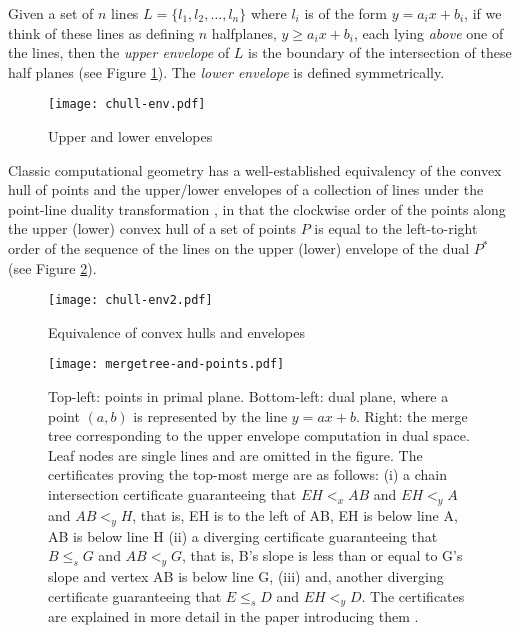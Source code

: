 \documentclass[11pt]{article}
\begin{document}
Given a set of $n$ lines $L= \{l_1, l_2, \ldots, l_n\}$ where $l_i$ is of the form
$y=a_ix+b_i$, if we think of these
lines as defining $n$ halfplanes, $y \ge a_ix+b_i$, each lying \emph{above}
one of the lines, then the \emph{upper envelope} of $L$ is the boundary of the intersection of these half planes (see Figure \ref{fig:envelope}). The \emph{lower envelope} is defined symmetrically.
\begin{figure}[H]
\begin{center}
\texttt{[image: chull-env.pdf]}
\caption{Upper and lower envelopes}
\label{fig:envelope}
\vspace{-0.2in}
\end{center}
\end{figure}

Classic computational geometry has a well-established equivalency of the
convex hull of points and the upper/lower envelopes of a collection of lines
under the point-line duality transformation \cite{Basch99MobileData, ORourke1998book}, in that the clockwise order of the points along the upper (lower) convex hull of a set of points $P$ is equal to the left-to-right order of the sequence of the lines on the upper (lower) envelope of the dual $P^*$ (see Figure \ref{fig:chull-env}). 

\begin{figure}[H]
\begin{center}
\texttt{[image: chull-env2.pdf]}
\caption{Equivalence of convex hulls and envelopes}
\label{fig:chull-env}
\end{center}
\end{figure}


\begin{figure*}[!ht]  \begin{center}
\texttt{[image: mergetree-and-points.pdf]}
\end{center}
\caption{Top-left: points in primal plane. Bottom-left: dual plane,
  where a point $(a, b)$ is represented by the line $y = ax + b$. Right: the merge tree corresponding to the upper envelope computation in dual space. Leaf nodes are single lines and are omitted in the figure. The certificates proving the top-most merge  are as follows: (i) a chain intersection certificate guaranteeing that $EH <_x AB$ and $EH <_y A$ and $AB <_y H$, that is, EH is to the left of AB, EH is below line A, AB is below line H (ii) a diverging certificate guaranteeing that $B {\leq}_s G$ and $AB <_y G$, that is, B's slope is less than or equal to G's slope and vertex AB is below line G, (iii) and, another diverging certificate guaranteeing that $E {\leq}_s D$ and $EH <_y D$. The certificates are explained in more detail in the paper introducing them \cite{Basch99MobileData}.}

\label{fig:mergetree}
\end{figure*}
\end{document}
